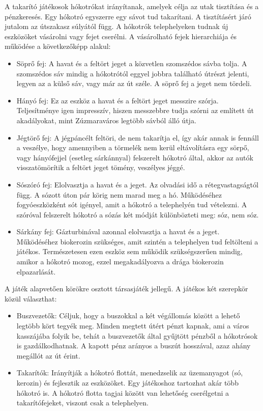 \par{A takarító játékosok hókotrókat irányítanak, amelyek célja az utak tisztítása és a pénzkeresés. Egy hókotró egyszerre egy sávot tud takarítani. A tisztításért járó jutalom az útszakasz súlyától függ. A hókotrók telephelyeken tudnak új eszközöket vásárolni vagy fejet cserélni. A vásárolható fejek hierarchiája és működése a következőképp alakul:}
\begin{itemize}
	\item Söprő fej: A havat és a feltört jeget a közvetlen szomszédos sávba tolja. A szomszédos sáv mindig a hókotrótól eggyel jobbra található útrészt jelenti, legyen az a külső sáv, vagy már az út széle. A söprő fej a jeget nem tördeli.
	\item Hányó fej: Ez az eszköz a havat és a feltört jeget messzire szórja. Teljesítménye igen impresszív, hiszen messzebbre tudja szórni az említett út akadályokat, mint Zúzmaraváros legtöbb sávból álló útja. 
	\item Jégtörő fej: A jégpáncélt feltöri, de nem takarítja el, így akár annak is fennáll a veszélye, hogy amennyiben a törmelék nem kerül eltávolításra egy sörpő, vagy hányófejjel (esetleg sárkánnyal) felszerelt hókotró által, akkor az autók visszatömörítik a feltört jeget tömény, veszélyes jéggé.
	\item Sószóró fej: Elolvasztja a havat és a jeget. Az olvadási idő a rétegvastagságtól függ. A sózott úton pár körig nem marad meg a hó. Működéséhez fogyóeszközként sót igényel, amit a hókotró a telephelyén tud vételezni. A szóróval felszerelt hókotró a sózás két módját különbözteti meg: sóz, nem sóz.
	\item Sárkány fej: Gázturbinával azonnal elolvasztja a havat és a jeget. Működéséhez biokerozin szükséges, amit szintén a telephelyen tud feltölteni a játékos. Természetesen ezen eszköz sem működik szükségszerűen mindig, amikor a hókotró mozog, ezzel megakadályozva a drága biokerozin elpazarlását.
\end{itemize}
\par{A játék alapvetően körökre osztott társasjáték jellegű. A játékos két szerepkör közül választhat:}
\begin{itemize}
	\item Buszvezetők: Céljuk, hogy a buszokkal a két végállomás között a lehető legtöbb kört tegyék meg. Minden megtett útért pénzt kapnak, ami a város kasszájába folyik be, tehát a buszvezetők által gyűjtött pénzből a hókotrósok is gazdálkodhatnak. A kapott pénz arányos a buszút hosszával, azaz ahány megállót az út érint.  
	\item Takarítók: Irányítják a hókotró flottát, menedzselik az üzemanyagot (só, kerozin) és fejlesztik az eszközöket. Egy játékoshoz tartozhat akár több hókotró is. A hókotró flotta tagjai között van lehetőség cserélgetni a takarítófejeket, viszont csak a telephelyen. 
\end{itemize}
